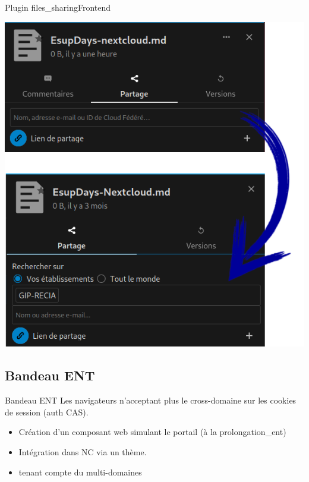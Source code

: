 \begin{frame}[fragile]{Plugin files\_sharing}{Frontend}

\includegraphics[height=0.75\textheight]{filesharing.png}
\end{frame}

\subsection{Bandeau ENT}
\begin{frame}{Bandeau ENT}
Les navigateurs n'acceptant plus le cross-domaine sur les cookies de session (auth CAS).
\begin{itemize}
	\item Création d'un composant web simulant le portail (à la prolongation\_ent)
	\item Intégration dans NC via un thème.
	\item tenant compte du multi-domaines   
\end{itemize}
\end{frame}
